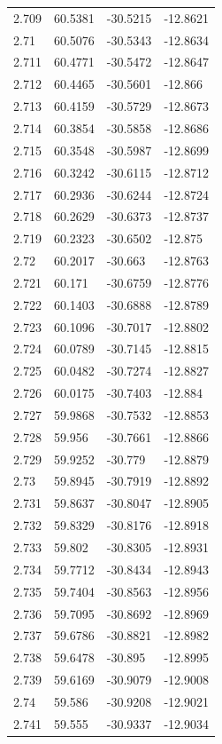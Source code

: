 \begin{tabular}{llll}
2.709 & 60.5381 & -30.5215 & -12.8621 \\
2.71 & 60.5076 & -30.5343 & -12.8634 \\
2.711 & 60.4771 & -30.5472 & -12.8647 \\
2.712 & 60.4465 & -30.5601 & -12.866 \\
2.713 & 60.4159 & -30.5729 & -12.8673 \\
2.714 & 60.3854 & -30.5858 & -12.8686 \\
2.715 & 60.3548 & -30.5987 & -12.8699 \\
2.716 & 60.3242 & -30.6115 & -12.8712 \\
2.717 & 60.2936 & -30.6244 & -12.8724 \\
2.718 & 60.2629 & -30.6373 & -12.8737 \\
2.719 & 60.2323 & -30.6502 & -12.875 \\
2.72 & 60.2017 & -30.663 & -12.8763 \\
2.721 & 60.171 & -30.6759 & -12.8776 \\
2.722 & 60.1403 & -30.6888 & -12.8789 \\
2.723 & 60.1096 & -30.7017 & -12.8802 \\
2.724 & 60.0789 & -30.7145 & -12.8815 \\
2.725 & 60.0482 & -30.7274 & -12.8827 \\
2.726 & 60.0175 & -30.7403 & -12.884 \\
2.727 & 59.9868 & -30.7532 & -12.8853 \\
2.728 & 59.956 & -30.7661 & -12.8866 \\
2.729 & 59.9252 & -30.779 & -12.8879 \\
2.73 & 59.8945 & -30.7919 & -12.8892 \\
2.731 & 59.8637 & -30.8047 & -12.8905 \\
2.732 & 59.8329 & -30.8176 & -12.8918 \\
2.733 & 59.802 & -30.8305 & -12.8931 \\
2.734 & 59.7712 & -30.8434 & -12.8943 \\
2.735 & 59.7404 & -30.8563 & -12.8956 \\
2.736 & 59.7095 & -30.8692 & -12.8969 \\
2.737 & 59.6786 & -30.8821 & -12.8982 \\
2.738 & 59.6478 & -30.895 & -12.8995 \\
2.739 & 59.6169 & -30.9079 & -12.9008 \\
2.74 & 59.586 & -30.9208 & -12.9021 \\
2.741 & 59.555 & -30.9337 & -12.9034 \\

\end{tabular}
